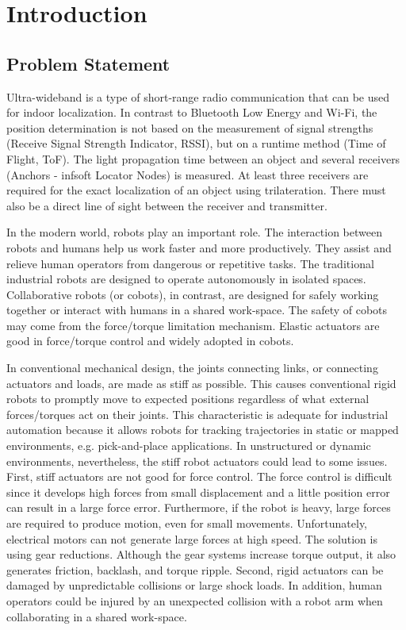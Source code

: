 \documentclass[\main/main.tex]{subfiles}
\begin{document}
\graphicspath{{img/}{01_intro/img/}}

\chapter{Introduction}

\section{Problem Statement}

Ultra-wideband is a type of short-range radio communication that can be used for indoor localization. In contrast to Bluetooth Low Energy and Wi-Fi, the position determination is not based on the measurement of signal strengths (Receive Signal Strength Indicator, RSSI), but on a runtime method (Time of Flight, ToF). The light propagation time between an object and several receivers (Anchors - infsoft Locator Nodes) is measured. At least three receivers are required for the exact localization of an object using trilateration. There must also be a direct line of sight between the receiver and transmitter.

In the modern world, robots play an important role. The interaction between robots and humans help us work faster and more productively. They assist and relieve human operators from dangerous or repetitive tasks. The traditional industrial robots are designed to operate autonomously in isolated spaces. Collaborative robots (or cobots), in contrast, are designed for safely working together or interact with humans in a shared work-space. The safety of cobots may come from the force/torque limitation mechanism. Elastic actuators are good in force/torque control and widely adopted in cobots.

In conventional mechanical design, the joints connecting links, or connecting actuators and loads, are made as stiff as possible. This causes conventional rigid robots to promptly move to expected positions regardless of what external forces/torques act on their joints. This characteristic is adequate for industrial automation because it allows robots for tracking trajectories in static or mapped environments, e.g. pick-and-place applications. In unstructured or dynamic environments, nevertheless, the stiff robot actuators could lead to some issues. First, stiff actuators are not good for force control. The force control is difficult since it develops high forces from small displacement and a little position error can result in a large force error. Furthermore, if the robot is heavy, large forces are required to produce motion, even for small movements. Unfortunately, electrical motors can not generate large forces at high speed. The solution is using gear reductions. Although the gear systems increase torque output, it also generates friction, backlash, and torque ripple. Second, rigid actuators can be damaged by unpredictable collisions or large shock loads. In addition, human operators could be injured by an unexpected collision with a robot arm when collaborating in a shared work-space.
\end{document}
